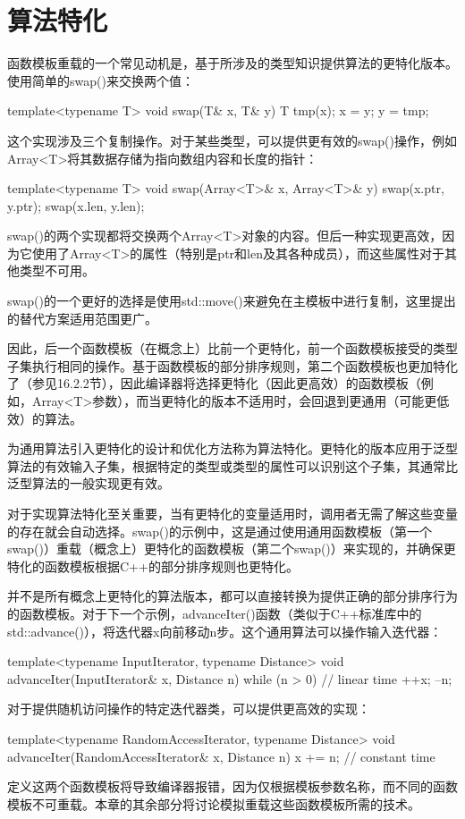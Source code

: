\section{算法特化}

函数模板重载的一个常见动机是，基于所涉及的类型知识提供算法的更特化版本。使用简单的swap()来交换两个值：

\begin{cpp}
template<typename T>
void swap(T& x, T& y)
{
	T tmp(x);
	x = y;
	y = tmp;
}
\end{cpp}

这个实现涉及三个复制操作。对于某些类型，可以提供更有效的swap()操作，例如Array<T>将其数据存储为指向数组内容和长度的指针：

\begin{cpp}
template<typename T>
void swap(Array<T>& x, Array<T>& y)
{
	swap(x.ptr, y.ptr);
	swap(x.len, y.len);
}
\end{cpp}

swap()的两个实现都将交换两个Array<T>对象的内容。但后一种实现更高效，因为它使用了Array<T>的属性（特别是ptr和len及其各种成员），而这些属性对于其他类型不可用。

\begin{notice}
swap()的一个更好的选择是使用std::move()来避免在主模板中进行复制，这里提出的替代方案适用范围更广。
\end{notice}

因此，后一个函数模板（在概念上）比前一个更特化，前一个函数模板接受的类型子集执行相同的操作。基于函数模板的部分排序规则，第二个函数模板也更加特化了（参见16.2.2节），因此编译器将选择更特化（因此更高效）的函数模板（例如，Array<T>参数），而当更特化的版本不适用时，会回退到更通用（可能更低效）的算法。

为通用算法引入更特化的设计和优化方法称为算法特化。更特化的版本应用于泛型算法的有效输入子集，根据特定的类型或类型的属性可以识别这个子集，其通常比泛型算法的一般实现更有效。

对于实现算法特化至关重要，当有更特化的变量适用时，调用者无需了解这些变量的存在就会自动选择。swap()的示例中，这是通过使用通用函数模板（第一个swap()）重载（概念上）更特化的函数模板（第二个swap()）来实现的，并确保更特化的函数模板根据C++的部分排序规则也更特化。

并不是所有概念上更特化的算法版本，都可以直接转换为提供正确的部分排序行为的函数模板。对于下一个示例，advanceIter()函数（类似于C++标准库中的std::advance()），将迭代器x向前移动n步。这个通用算法可以操作输入迭代器：

\begin{cpp}
template<typename InputIterator, typename Distance>
void advanceIter(InputIterator& x, Distance n)
{
	while (n > 0) { // linear time
		++x;
		--n;
	}
}
\end{cpp}

对于提供随机访问操作的特定迭代器类，可以提供更高效的实现：

\begin{cpp}
template<typename RandomAccessIterator, typename Distance>
void advanceIter(RandomAccessIterator& x, Distance n) {
	x += n; // constant time
}
\end{cpp}

定义这两个函数模板将导致编译器报错，因为仅根据模板参数名称，而不同的函数模板不可重载。本章的其余部分将讨论模拟重载这些函数模板所需的技术。












